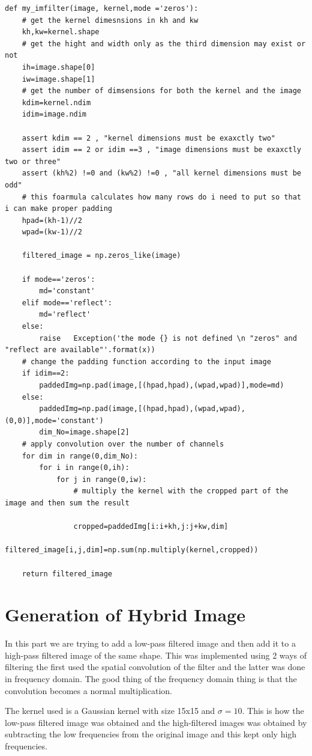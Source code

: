 \begin{lstlisting}
def my_imfilter(image, kernel,mode ='zeros'):
	# get the kernel dimesnsions in kh and kw
	kh,kw=kernel.shape
	# get the hight and width only as the third dimension may exist or not
	ih=image.shape[0]
	iw=image.shape[1]
	# get the number of dimsensions for both the kernel and the image
	kdim=kernel.ndim
	idim=image.ndim
	
	assert kdim == 2 , "kernel dimensions must be exaxctly two"
	assert idim == 2 or idim ==3 , "image dimensions must be exaxctly two or three"
	assert (kh%2) !=0 and (kw%2) !=0 , "all kernel dimensions must be odd"
	# this foarmula calculates how many rows do i need to put so that i can make proper padding
	hpad=(kh-1)//2
	wpad=(kw-1)//2
	
	filtered_image = np.zeros_like(image)
	
	if mode=='zeros':
		md='constant'
	elif mode=='reflect':
		md='reflect'
	else:
		raise   Exception('the mode {} is not defined \n "zeros" and "reflect are available"'.format(x))
	# change the padding function according to the input image
	if idim==2:
		paddedImg=np.pad(image,[(hpad,hpad),(wpad,wpad)],mode=md)
	else:
		paddedImg=np.pad(image,[(hpad,hpad),(wpad,wpad),(0,0)],mode='constant')
		dim_No=image.shape[2]
	# apply convolution over the number of channels
	for dim in range(0,dim_No):
		for i in range(0,ih):
			for j in range(0,iw):
				# multiply the kernel with the cropped part of the image and then sum the result
				
				cropped=paddedImg[i:i+kh,j:j+kw,dim]
				filtered_image[i,j,dim]=np.sum(np.multiply(kernel,cropped))
	
	return filtered_image

\end{lstlisting}

\newpage
\section*{Generation of Hybrid Image}
In this part we are trying to add a low-pass filtered image and then add it to a high-pass filtered image of the same shape. This was implemented using 2 ways of filtering the first used the spatial convolution of the filter and the latter was done in frequency domain. The good thing of the frequency domain thing is that the convolution becomes a normal multiplication. 

The kernel used is a Gaussian kernel with size 15x15 and $\sigma = 10$.
This is how the low-pass filtered image was obtained and the high-filtered images was obtained by subtracting the low frequencies from the original image and this kept only high frequencies. 



